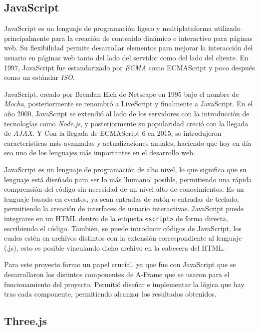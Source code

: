 \documentclass[a4paper, 12pt]{book}
\begin{document}
\subsection{JavaScript}
\label{subsec:JavaScript}
JavaScript es un lenguaje de programación ligero y multiplataforma utilizado principalmente para la creación de contenido dinámico e interactivo para páginas web.
Su flexibilidad permite desarrollar elementos para mejorar la interacción del usuario en páginas web tanto del lado del servidor como del lado del cliente. En 1997, JavaScript fue estandarizado
por \textit{ECMA} como ECMAScript y poco después como un estándar \textit{ISO}.

JavaScript, creado por Brendan Eich de Netscape en 1995 bajo el nombre de \textit{Mocha}, posteriormente se renombró a LiveScript y finalmente a JavaScript.
En el año 2000, JavaScript se extendió al lado de los servidores con la introducción de tecnologías como \textit{Node.js}, y posteriormente su popularidad creció con la llegada de \textit{AJAX}. Y Con la llegada de ECMAScript 6 en 2015, se introdujeron características más avanzadas y
actualizaciones anuales, haciendo que hoy en día sea uno de los lenguajes más importantes en el desarrollo web.

JavaScript es un lenguaje de programación de alto nivel, lo que significa que su lenguaje está diseñado para ser lo más 'humano' posible, permitiendo una rápida comprensión del código sin necesidad de un nivel alto de conocimientos.
Es un lenguaje basado en eventos, ya sean entradas de ratón o entradas de teclado, permitiendo la creación de interfaces de usuario interactivas. JavaScript puede integrarse en un HTML dentro de la etiqueta \texttt{<script>} de forma directa, escribiendo el código.
También, se puede introducir códigos de JavaScript, los cuales estén en archivos distintos con la extensión correspondiente al lenguaje (.js), esto es posible vinculando dicho archivo en la cabecera del HTML.

Para este proyecto formo un papel crucial, ya que fue con JavaScript que se desarrollaron los distintos componentes de A-Frame que se usaron para el funcionamiento del proyecto. Permitió diseñar e implementar la lógica que hay tras cada componente, permitiendo alcanzar los resultados obtenidos.

\subsection{Three.js}
\label{subsec:Threejs}
\end{document}
